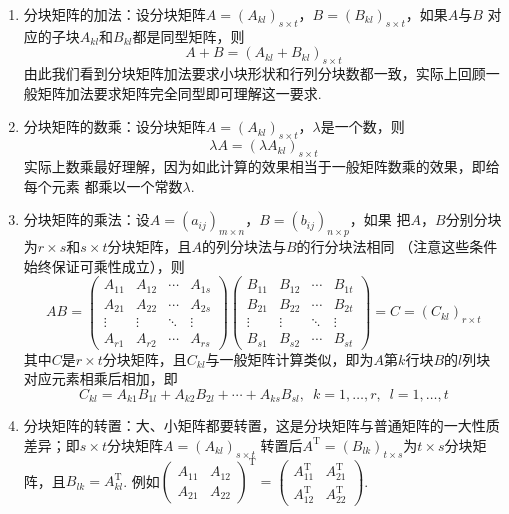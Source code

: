 \begin{enumerate}
    \item 分块矩阵的加法：设分块矩阵$A=(A_{kl})_{s \times t}$，$B=(B_{kl})_{s \times t}$，如果$A$与$B$
    对应的子块$A_{kl}$和$B_{kl}$都是同型矩阵，则\[A+B=(A_{kl}+B_{kl})_{s \times t}\]
    由此我们看到分块矩阵加法要求小块形状和行列分块数都一致，实际上回顾一般矩阵加法要求矩阵完全同型即可理解这一要求.

    \item 分块矩阵的数乘：设分块矩阵$A=(A_{kl})_{s \times t}$，$\lambda$是一个数，则
    \[\lambda A=(\lambda A_{kl})_{s \times t}\]
    实际上数乘最好理解，因为如此计算的效果相当于一般矩阵数乘的效果，即给每个元素
    都乘以一个常数$\lambda$.

    \item 分块矩阵的乘法：设$A=(a_{ij})_{m \times n}$，$B=(b_{ij})_{n \times p}$，如果
    把$A$，$B$分别分块为$r \times s$和$s \times t$分块矩阵，且$A$的列分块法与$B$的行分块法相同
    （注意这些条件始终保证可乘性成立），则
    \[AB=\begin{pmatrix}
        A_{11} & A_{12} & \cdots & A_{1s} \\
        A_{21} & A_{22} & \cdots & A_{2s} \\
        \vdots & \vdots & \ddots & \vdots \\
        A_{r1} & A_{r2} & \cdots & A_{rs}
    \end{pmatrix}\begin{pmatrix}
        B_{11} & B_{12} & \cdots & B_{1t} \\
        B_{21} & B_{22} & \cdots & B_{2t} \\
        \vdots & \vdots & \ddots & \vdots \\
        B_{s1} & B_{s2} & \cdots & B_{st}
    \end{pmatrix}=C=(C_{kl})_{r \times t}\]
    其中$C$是$r \times t$分块矩阵，且$C_{kl}$与一般矩阵计算类似，即为$A$第$k$行块$B$的$l$列块对应元素相乘后相加，即
    \[C_{kl}=A_{k1}B_{1l}+A_{k2}B_{2l}+\cdots+A_{ks}B_{sl},\enspace k=1,\ldots,r,\enspace l=1,\ldots,t\]

    \item 分块矩阵的转置：大、小矩阵都要转置，这是分块矩阵与普通矩阵的一大性质差异；即$s \times t$分块矩阵$A=(A_{kl})_{s \times t}$
    转置后$A^\mathrm{T}=(B_{lk})_{t \times s}$为$t \times s$分块矩阵，且$B_{lk}=A_{kl}^\mathrm{T}$.
    例如$\begin{pmatrix}
        A_{11} & A_{12} \\ A_{21} & A_{22}
    \end{pmatrix}^\mathrm{T}=\begin{pmatrix}
        A_{11}^\mathrm{T} & A_{21}^\mathrm{T} \\ A_{12}^\mathrm{T} & A_{22}^\mathrm{T}
    \end{pmatrix}$.
\end{enumerate}

